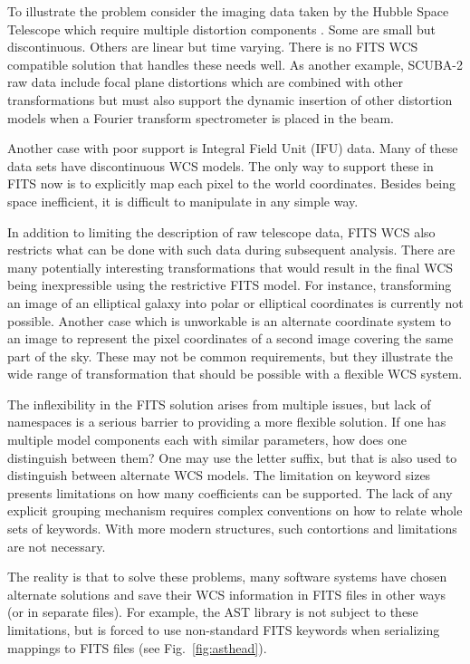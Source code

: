 \documentclass[final,authoryear,5p,times,twocolumn]{elsarticle}
\begin{document}
{{To illustrate the problem consider the imaging data taken by the
Hubble Space Telescope which require multiple distortion components \citep[see e.g.,][]{2013ASPC..475...49H}.
Some are small but discontinuous. Others are linear but time varying.
There is no FITS WCS compatible solution that handles these needs well.
As another example, SCUBA-2 raw data \citep[see
e.g.,][]{2013MNRAS.430.2513H} include focal plane distortions which are
combined with other transformations but must also support the dynamic
insertion of other distortion models when a Fourier transform
spectrometer \citep{2010SPIE.7741E..67G} is placed in the beam.


Another case with poor support is Integral Field Unit (IFU) data.
Many of these data sets
have discontinuous WCS models. The only way to support these in FITS
now is to explicitly map each pixel to the world coordinates. Besides
being space inefficient, it is difficult to manipulate in any simple
way.


In addition to limiting the description of raw telescope data, FITS
WCS also restricts what can be done with such data during subsequent
analysis. There are many potentially interesting transformations that
would result in the final WCS being inexpressible using the
restrictive FITS model. For instance, transforming an image of an
elliptical galaxy into polar or elliptical coordinates is currently not possible. Another
case which is unworkable is an alternate coordinate system to an image to
represent the pixel coordinates of a second image covering the same
part of the sky.  These may not be common requirements, but they
illustrate the wide range of transformation that should be possible
with a flexible WCS system.


The inflexibility in the FITS solution arises from multiple issues,
but lack of namespaces is a serious barrier to providing a more
flexible solution. If one has multiple model components each with
similar parameters, how does one distinguish between them? One may use
the letter suffix, but that is also used to distinguish between
alternate WCS models. The limitation on keyword sizes presents
limitations on how many coefficients can be supported. The lack of any
explicit grouping mechanism requires complex conventions on how to
relate whole sets of keywords. With more modern structures, such
contortions and limitations are not necessary.


The reality is that to solve these problems, many software systems
have chosen alternate solutions and save their WCS information in FITS
files in other ways (or in separate files). For example, the AST
library \citep{1998ASPC..145...41W,2012ASPC..461..825B} is not subject
to these limitations, but
is forced to use non-standard FITS keywords when serializing mappings
to FITS files (see Fig.~\ref{fig:asthead}).


}}
\end{document}
